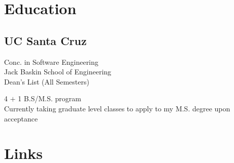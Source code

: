 \documentclass[letterpaper]{deedy-resume} %
\begin{document}




\begin{minipage}[t]{0.33\textwidth} %


\section{Education} 

\subsection{UC Santa Cruz }



Conc. in Software Engineering \\
Jack Baskin School of Engineering \\
Dean's List (All Semesters) \\

4 $+$ 1 B.S/M.S. program\\
Currently taking graduate level classes to apply to my M.S. degree upon acceptance 

\sectionspace %


\sectionspace %

\iffalse
\section{Links} 


\end{minipage}
\end{document}
